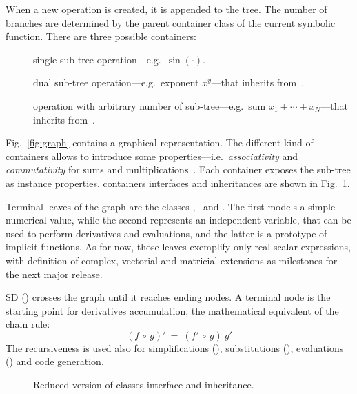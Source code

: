 When a new operation is created, it is appended to the tree. The number of branches are determined by the parent container class of the current symbolic function. There are three possible containers:
\begin{description}
  \item[\CASOp] single sub-tree operation---e.g.~$\sin(\cdot)$.
  \item[\CASBinaryOp] dual sub-tree operation---e.g.~exponent $x^y$---that inherits from~\CASOp.
  \item[\CASNaryOp] operation with arbitrary number of sub-tree---e.g.~sum $x_1 + \cdots + x_N$---that inherits from~\CASOp.
\end{description}
Fig.~\ref{fig:graph} contains a graphical representation. The different kind of containers allows to introduce some properties---i.e.~\emph{associativity} and \emph{commutativity} for sums and multiplications~\cite{cohen2003computer}. Each container exposes the sub-tree as instance properties.  containers interfaces and inheritances are shown in Fig.~\ref{fig:uml-container}. 

Terminal leaves of the graph are the classes \CASConstant, \CASVariable~and \CASFunction. The first models a simple numerical value, while the second represents an independent variable, that can be used to perform derivatives and evaluations, and the latter is a prototype of implicit functions. As for now, those leaves exemplify only real scalar expressions, with definition of complex, vectorial and matricial extensions as milestones for the next major release.

SD (\CASOpdiff) crosses the graph until it reaches ending nodes. A terminal node is the starting point for derivatives accumulation, the mathematical equivalent of the chain rule:
\begin{equation}
\left( f  \, \circ \, g \right)' \: = \:
\left( f' \, \circ \, g \right) \: g'
\end{equation}
The recursiveness is used also for simplifications (\CASOpsimplify), substitutions (\CASOpsubs), evaluations (\CASOpcall) and code generation.

\begin{figure}[ht!]
\centering

\caption{\label{fig:uml-container}Reduced version of classes interface and inheritance. }
\end{figure}

